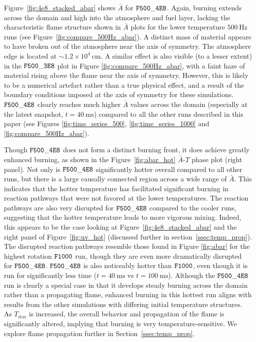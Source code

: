 \documentclass[preprint,times,tighten]{aastex63}
\begin{document}
Figure~\ref{fig:4e8_stacked_abar} shows $\bar{A}$ for $\tt{F500\_4E8}$. Again, burning extends 
across the domain and high into the atmosphere and fuel layer, lacking the characteristic flame 
structure shown in $\bar{A}$ plots for the lower temperature $500~\mathrm{Hz}$ runs (see 
Figure~\ref{fig:compare_500Hz_abar}). A distinct mass of material appears to have broken out of the 
atmosphere near the axis of symmetry. The atmosphere edge is located at $\sim 1.2\times 
10^4~\mathrm{cm}$. A similar effect is also visible (to a lesser extent) in the $\tt{F500\_3E8}$ 
plot in Figure \ref{fig:compare_500Hz_abar}, with a faint haze of material rising above the flame near the axis of symmetry. 
However, this is likely to be a numerical artefact rather than a true physical effect, and a result 
of the boundary conditions imposed at the axis of symmetry for these simulations. $\tt{F500\_4E8}$ 
clearly reaches much higher $\bar{A}$ values across the domain (especially at the latest snapshot, 
$t = 40~\mathrm{ms}$) compared to all the other runs described in this paper (see Figures 
\ref{fig:time_series_500}, \ref{fig:time_series_1000} and \ref{fig:compare_500Hz_abar}). 


 Though $\tt{F500\_4E8}$ does not form a distinct burning front, it does achieve greatly enhanced burning, as shown in the Figure~\ref{fig:abar_hot} $\bar{A}$-$T$ phase plot (right panel). Not only is $\tt{F500\_4E8}$ significantly hotter overall compared to all other runs, but there is a large causally connected region across a wide range of $\bar{A}$. This indicates that the hotter temperature has facilitated significant burning in reaction pathways that were not favored at the lower temperatures. The reaction pathways are also very disrupted for $\tt{F500\_4E8}$ compared to the cooler runs, suggesting that the hotter temperature leads to more vigorous mixing. Indeed, this appears to be the case looking at Figure~\ref{fig:4e8_stacked_abar} and the right panel of Figure~\ref{fig:uv_hot} (discussed further in section~\ref{ssec:temp_prop}). The disrupted reaction pathways resemble those found in Figure \ref{fig:abar} for the highest rotation $\tt{F1000}$ run, though they are even more dramatically disrupted for $\tt{F500\_4E8}$. $\tt{F500\_4E8}$ is also noticeably hotter than $\tt{F1000}$, even though it is run for significantly less time ($t = 40~\mathrm{ms}$ vs $t = 100~\mathrm{ms}$). Although the $\tt{F500\_4E8}$ run is clearly a special case in that it develops steady burning across the domain rather than a propagating flame, enhanced burning in this hottest run aligns with results from the other simulations with differing initial temperature structures. As $T_{\mathrm{star}}$ is increased, the overall behavior and propagation of the flame is significantly altered, implying that burning is very temperature-sensitive. We explore flame propagation further in Section~\ref{ssec:temp_prop}.
\end{document}
